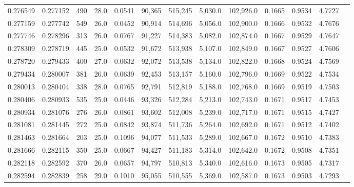 \begin{tabular}{rrrrrrrrrrrrr}
0.276549 & 0.277152 &   490 & 28.0 &                                     0.0541 &  90,365 & 515,245 &   5,030.0 & 102,926.0 & 0.1665 & 0.9534 & 4.7727 \\
0.277159 & 0.277742 &   549 & 26.0 &                                     0.0452 &  90,914 & 514,696 &   5,056.0 & 102,900.0 & 0.1666 & 0.9532 & 4.7676 \\
0.277746 & 0.278296 &   313 & 26.0 &                                     0.0767 &  91,227 & 514,383 &   5,082.0 & 102,874.0 & 0.1667 & 0.9529 & 4.7647 \\
0.278309 & 0.278719 &   445 & 25.0 &                                     0.0532 &  91,672 & 513,938 &   5,107.0 & 102,849.0 & 0.1667 & 0.9527 & 4.7606 \\
0.278720 & 0.279433 &   400 & 27.0 &                                     0.0632 &  92,072 & 513,538 &   5,134.0 & 102,822.0 & 0.1668 & 0.9524 & 4.7569 \\
0.279434 & 0.280007 &   381 & 26.0 &                                     0.0639 &  92,453 & 513,157 &   5,160.0 & 102,796.0 & 0.1669 & 0.9522 & 4.7534 \\
0.280013 & 0.280404 &   338 & 28.0 &                                     0.0765 &  92,791 & 512,819 &   5,188.0 & 102,768.0 & 0.1669 & 0.9519 & 4.7503 \\
0.280406 & 0.280933 &   535 & 25.0 &                                     0.0446 &  93,326 & 512,284 &   5,213.0 & 102,743.0 & 0.1671 & 0.9517 & 4.7453 \\
0.280934 & 0.281076 &   276 & 26.0 &                                     0.0861 &  93,602 & 512,008 &   5,239.0 & 102,717.0 & 0.1671 & 0.9515 & 4.7427 \\
0.281081 & 0.281445 &   272 & 25.0 &                                     0.0842 &  93,874 & 511,736 &   5,264.0 & 102,692.0 & 0.1671 & 0.9512 & 4.7402 \\
0.281463 & 0.281664 &   203 & 25.0 &                                     0.1096 &  94,077 & 511,533 &   5,289.0 & 102,667.0 & 0.1672 & 0.9510 & 4.7383 \\
0.281666 & 0.282115 &   350 & 25.0 &                                     0.0667 &  94,427 & 511,183 &   5,314.0 & 102,642.0 & 0.1672 & 0.9508 & 4.7351 \\
0.282118 & 0.282592 &   370 & 26.0 &                                     0.0657 &  94,797 & 510,813 &   5,340.0 & 102,616.0 & 0.1673 & 0.9505 & 4.7317 \\
0.282594 & 0.282839 &   258 & 29.0 &                                     0.1010 &  95,055 & 510,555 &   5,369.0 & 102,587.0 & 0.1673 & 0.9503 & 4.7293 \\

\end{tabular}
